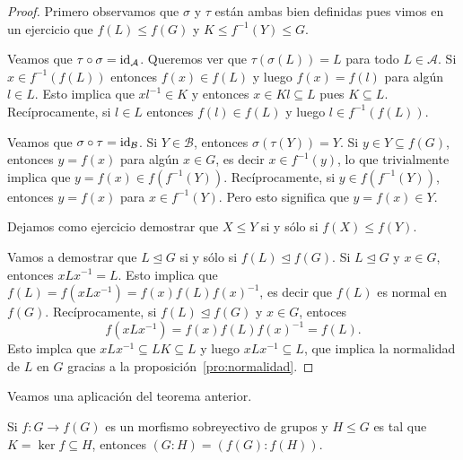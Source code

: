 \begin{proof}
	Primero observamos que $\sigma$ y $\tau$ están ambas bien definidas pues vimos en un ejercicio
	que $f(L)\leq f(G)$ y $K\leq f^{-1}(Y)\leq G$. 
	
	Veamos que $\tau\circ\sigma=\operatorname{id}_\mathcal{A}$. Queremos ver que $\tau(\sigma(L))=L$ para todo $L\in\mathcal{A}$. Si $x\in f^{-1}(f(L))$ entonces
	$f(x)\in f(L)$ y luego $f(x)=f(l)$ para algún $l\in L$. Esto implica que $xl^{-1}\in K$ y entonces $x\in Kl\subseteq L$ pues $K\subseteq L$. 
	Recíprocamente, si $l\in L$ entonces $f(l)\in f(L)$ y luego $l\in f^{-1}(f(L))$. 
	
	Veamos que $\sigma\circ\tau=\operatorname{id}_\mathcal{B}$. Si $Y\in\mathcal{B}$, entonces $\sigma(\tau(Y))=Y$. Si $y\in Y\subseteq f(G)$, entonces
	$y=f(x)$ para algún $x\in G$, es decir $x\in f^{-1}(y)$, lo que trivialmente implica que $y=f(x)\in f(f^{-1}(Y))$. Recíprocamente, si $y\in f(f^{-1}(Y))$, entonces
	$y=f(x)$ para $x\in f^{-1}(Y)$. Pero esto significa que $y=f(x)\in Y$.   
	
	Dejamos como ejercicio demostrar que $X\leq Y$ si y sólo si $f(X)\leq f(Y)$. 
	
	Vamos a demostrar que $L\unlhd G$ si y sólo si $f(L)\unlhd f(G)$. Si $L\unlhd G$ y $x\in G$, entonces
	$xLx^{-1}=L$. Esto implica que $f(L)=f(xLx^{-1})=f(x)f(L)f(x)^{-1}$, es decir que $f(L)$ es normal en $f(G)$. Recíprocamente, si 
	$f(L)\unlhd f(G)$ y $x\in G$, entoces 
	\[
	f(xLx^{-1})=f(x)f(L)f(x)^{-1}=f(L).
	\]
	Esto implca que $xLx^{-1}\subseteq LK\subseteq L$ y luego
	$xLx^{-1}\subseteq L$, que implica la normalidad de $L$ en $G$ gracias a la proposición~\ref{pro:normalidad}.
\end{proof}

Veamos una aplicación del teorema anterior. 

\begin{proposition}
	Si $f\colon G\to f(G)$ es un morfismo sobreyectivo de grupos y $H\leq G$ es tal que $K=\ker f\subseteq H$, entonces
	$(G:H)=(f(G):f(H))$. 
\end{proposition}

